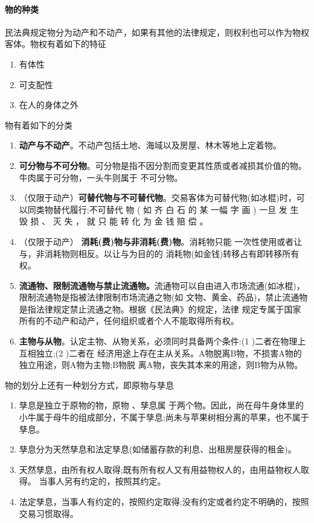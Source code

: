 \documentclass[UTF8,12pt]{ctexart}
\numberwithin{equation}{section} %
\numberwithin{figure}{section}
\numberwithin{table}{section}
\begin{document}
	\paragraph{物的种类} 民法典规定物分为动产和不动产，如果有其他的法律规定，则权利也可以作为物权客体。物权有着如下的特征
	\begin{enumerate}
		\item 有体性
		
		\item 可支配性
		
		\item 在人的身体之外
	\end{enumerate}
	
	物有着如下的分类
	\begin{enumerate}
		\item \textbf{动产与不动产}。不动产包括土地、海域以及房屋、林木等地上定着物。
		 
		\item \textbf{可分物与不可分物}。可分物是指不因分割而变更其性质或者减损其价值的物。牛肉属于可分物，一头牛则属于 不可分物。
		 
		\item （仅限于动产）\textbf{可替代物与不可替代物}。交易客体为可替代物(如冰棍)时，可以同类物替代履行;不可替代 物 ( 如 齐 白 石 的 某 一幅 字 画 ) 一旦 发 生 毁 损 、 灭 失 ， 就 只 能 转 化 为 金 钱 赔 偿 。
		
		\item （仅限于动产） \textbf{消耗(费)物与非消耗(费)物}。消耗物只能 一次性使用或者让与，非消耗物则相反。以让与为目的的 消耗物(如金钱)转移占有即转移所有权。
		
		\item \textbf{流通物、限制流通物与禁止流通物。}流通物可以自由进入市场流通(如冰棍)，限制流通物是指被法律限制市场流通之物(如 文物、黄金、药品)，禁止流通物是指法律规定禁止流通之物。根据《民法典》的规定，法律 规定专属于国家所有的不动产和动产，任何组织或者个人不能取得所有权。
		
		\item \textbf{主物与从物}。认定主物、从物关系，必须同时具备两个条件:(1 )二者在物理上互相独立;(2 )二者在 经济用途上存在主从关系。A物脱离B物，不损害A物的独立用途，则A物为主物;B物脱 离A物，丧失其本来的用途，则B物为从物。
	\end{enumerate}
	
	物的划分上还有一种划分方式，即原物与孳息
	\begin{enumerate}
		\item 孳息是独立于原物的物，原物 、孳息属 于两个物。因此，尚在母牛身体里的小牛属于母牛的组成部分，不属于孳息;尚未与苹果树相分离的苹果，也不属于孳息。

		\item 孳息分为天然孳息和法定孳息(如储蓄存款的利息、出租房屋获得的租金)。
		
		\item 天然孳息，由所有权人取得;既有所有权人又有用益物权人的，由用益物权人取得。 当事人另有约定的，按照其约定。
		
		\item 法定孳息，当事人有约定的，按照约定取得;没有约定或者约定不明确的，按照交易习惯取得。
	\end{enumerate}
	
\end{document}
